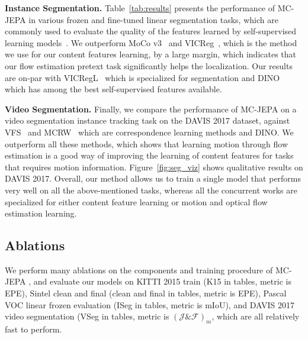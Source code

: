 \documentclass{article} %
\newcommand{\algospace}{MC-JEPA }
\newcommand{\parspace}{\vspace{0mm}}
\begin{document}
\noindent\textbf{Instance Segmentation.} Table~\ref{tab:results} presents the performance of \algospace in various frozen and fine-tuned linear segmentation tasks, which are commonly used to evaluate the quality of the features learned by self-supervised learning models~\citep{zhou2022ibot, bardes2022vicregl}. We outperform MoCo v3~\citep{chen2021mocov3} and VICReg~\citep{bardes2022vicreg}, which is the method we use for our content features learning, by a large margin, which indicates that our flow estimation pretext task significantly helps the localization. Our results are on-par with VICRegL~\citep{bardes2022vicregl} which is specialized for segmentation and DINO~\citep{caron2021dino} which has among the best self-supervised features available. 
\parspace

\noindent\textbf{Video Segmentation.} Finally, we compare the performance of \algospace on a video segmentation instance tracking task on the DAVIS 2017 dataset, against VFS~\citep{xu2021vfs} and MCRW~\citep{bian2022mcrw} which are correspondence learning methods and DINO. We outperform all these methods, which shows that learning motion through flow estimation is a good way of improving the learning of content features for tasks that requires motion information. Figure~\ref{fig:seg_viz} shows qualitative results on DAVIS 2017. Overall, our method allows us to train a single model that performs very well on all the above-mentioned tasks, whereas all the concurrent works are specialized for either content feature learning or motion and optical flow estimation learning.

\subsection{Ablations}

We perform many ablations on the components and training procedure of \algospace, and evaluate our models on KITTI 2015 train (K15 in tables, metric is EPE), Sintel clean and final (clean and final in tables, metric is EPE), Pascal VOC linear frozen evaluation (ISeg in tables, metric is mIoU), and DAVIS 2017 video segmentation (VSeg in tables, metric is $(\mathcal{J}\&\mathcal{F})_m$, which are all relatively fast to perform.
\parspace
\end{document}
